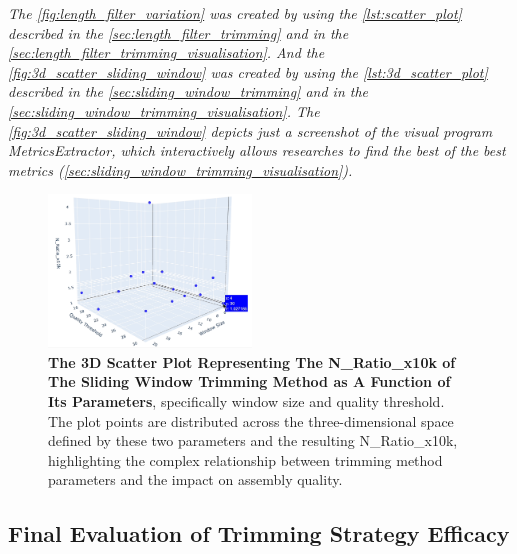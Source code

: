 \textit{The \autoref{fig:length_filter_variation} was created by using the \autoref{lst:scatter_plot} described in the  \autoref{sec:length_filter_trimming} and in the  \autoref{sec:length_filter_trimming_visualisation}. And the \autoref{fig:3d_scatter_sliding_window} was created by using the \autoref{lst:3d_scatter_plot} described in the  \autoref{sec:sliding_window_trimming} and in the \autoref{sec:sliding_window_trimming_visualisation}. The \autoref{fig:3d_scatter_sliding_window} depicts just a screenshot of the visual program MetricsExtractor, which interactively allows researches to find the best of the best metrics (\autoref{sec:sliding_window_trimming_visualisation}).}


\begin{figure}
  \centering
  \includegraphics[width=0.48\textwidth]{resources/images/3d_scatter_sliding_window.png}
  \caption{\textbf{The 3D Scatter Plot Representing The N\_Ratio\_x10k of The Sliding Window Trimming Method as A Function of Its Parameters}, specifically window size and quality threshold. The plot points are distributed across the three-dimensional space defined by these two parameters and the resulting N\_Ratio\_x10k, highlighting the complex relationship between \gls{trimming} method parameters and the impact on \gls{assembly} quality.}
  \label{fig:3d_scatter_sliding_window}
\end{figure}



\subsection{Final Evaluation of Trimming Strategy Efficacy}

